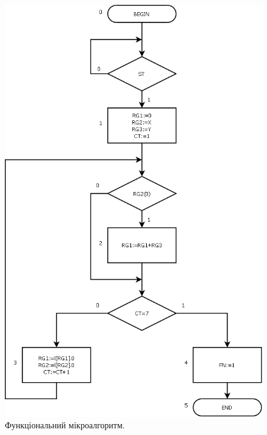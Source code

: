 \documentclass[a4paper, 10pt]{article}
\begin{document}
\begin{figure}[H]
\begin{center}
\includegraphics[scale=0.25]{f_alg.png}
\caption{Функціональний мікроалгоритм.}
\end{center}
\end{figure}
\end{document}
